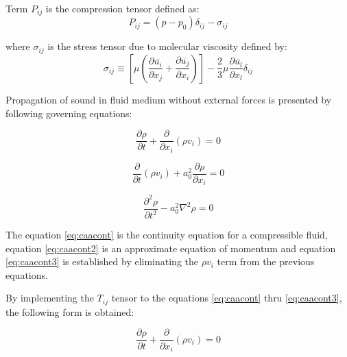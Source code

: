 Term $P_{ij}$ is the compression tensor defined as:
\begin{equation} \label{eq:Ptensor}
P_{ij} = (p - p_0)\delta_{ij} - \sigma_{ij}
\end{equation}

\noindent where $\sigma_{ij}$ is the stress tensor due to molecular viscosity defined by:
\begin{equation} \label{eq:viscstress}
\sigma_{ij}
\equiv
\left[ \mu \left( \frac{\partial \overline{u_i}}{\partial x_{j}} + \frac{\partial \overline{u_j}}{\partial x_{i}} \right) \right]
- \frac{2}{3} \mu \frac{\partial \overline{u_l}}{\partial x_l} \delta_{ij}
\end{equation}

Propagation of sound in fluid medium without external forces is presented by following governing equations:

\begin{equation} \label{eq:caacont}
\frac{\partial \rho}{\partial t} + \frac{\partial}{\partial x_i} \left( \rho v_i \right) = 0
\end{equation}

\begin{equation} \label{eq:caacont2}
\frac{\partial}{\partial t} \left(\rho v_i \right) + a_0^2\frac{\partial \rho}{\partial x_i} = 0
\end{equation}

\begin{equation} \label{eq:caacont3}
\frac{\partial^2 \rho}{\partial t^2} - a_0^2 \nabla^2 \rho = 0
\end{equation}

The equation \ref{eq:caacont} is the continuity equation for a compressible fluid, equation \ref{eq:caacont2} is an approximate equation of momentum and equation \ref{eq:caacont3} is established by eliminating the $\rho v_i$ term from the previous equations.

%
By implementing the $T_{ij}$ tensor to the equations \ref{eq:caacont} thru \ref{eq:caacont3}, the following form is obtained: 

\begin{equation} \label{eq:caacont4}
\frac{\partial \rho}{\partial t} + \frac{\partial}{\partial x_i} \left( \rho v_i \right) = 0
\end{equation}

